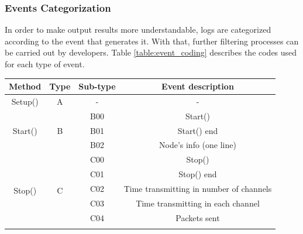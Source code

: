\documentclass[a4paper]{article}
\begin{document}
		\subsubsection{Events Categorization}
		\label{section:events_categorization}	
		In order to make output results more understandable, logs are categorized according to the event that generates it. With that, further filtering processes can be carried out by developers. Table \ref{table:event_coding} describes the codes used for each type of event.		
		\begin{table}[h!]
		\centering
		\scriptsize
		\begin{tabular}{|c|c|c|c|}
		\hline
		\textbf{Method}                            & \textbf{Type}       & \textbf{Sub-type} & \textbf{Event description}                              \\ \hline
		Setup()                                    & A                   & -                 & -                                                       \\ \hline
		\multirow{3}{*}{Start()}                   & \multirow{3}{*}{B}  & B00               & Start()                                                 \\ \cline{3-4} 
		                                           &                     & B01               & Start() end                                             \\ \cline{3-4} 
		                                           &                     & B02               & Node's info (one line)                                  \\ \hline
		\multirow{6}{*}{Stop()}                    & \multirow{6}{*}{C}  & C00               & Stop()                                                  \\ \cline{3-4} 
		                                           &                     & C01               & Stop() end                                              \\ \cline{3-4} 
		                                           &                     & C02               & Time transmitting in number of channels                 \\ \cline{3-4} 
		                                           &                     & C03               & Time transmitting in each channel                       \\ \cline{3-4} 
		                                           &                     & C04               & Packets sent                                            \\ \cline{3-4} 

\end{tabular}
\end{table}
\end{document}
